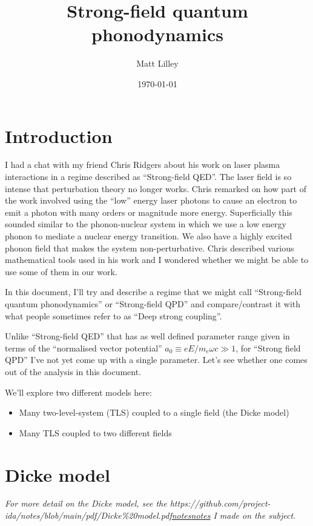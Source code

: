 \documentclass[
]{article}
\title{Strong-field quantum phonodynamics}
\author{Matt Lilley}
\date{\today}  %
\let\oldhref\href
\renewcommand{\href}[2]{\ifx#1\urlprefix\oldhref{#1}{#2}\else\uline{\oldhref{#1}{#2}}\fi}
\renewcommand{\[}{\begin{equation}}
\renewcommand{\]}{\end{equation}}
\providecommand{\tightlist}{%
  \setlength{\itemsep}{0pt}\setlength{\parskip}{0pt}}
\begin{document}
\maketitle

\section{Introduction}\label{introduction}

I had a chat with my friend Chris Ridgers about his work on laser plasma
interactions in a regime described as ``Strong-field QED''. The laser
field is so intense that perturbation theory no longer works. Chris
remarked on how part of the work involved using the ``low'' energy laser
photons to cause an electron to emit a photon with many orders or
magnitude more energy. Superficially this sounded similar to the
phonon-nuclear system in which we use a low energy phonon to mediate a
nuclear energy transition. We also have a highly excited phonon field
that makes the system non-perturbative. Chris described various
mathematical tools used in his work and I wondered whether we might be
able to use some of them in our work.

In this document, I'll try and describe a regime that we might call
``Strong-field quantum phonodynamics'' or ``Strong-field QPD'' and
compare/contrast it with what people sometimes refer to as ``Deep strong
coupling''.

Unlike ``Strong-field QED'' that has as well defined parameter range
given in terms of the ``normalised vector potential''
\(a_0\equiv eE/m_e\omega c\gg 1\), for ``Strong field QPD'' I've not yet
come up with a single parameter. Let's see whether one comes out of the
analysis in this document.

We'll explore two different models here:

\begin{itemize}
\tightlist
\item
  Many two-level-system (TLS) coupled to a single field (the Dicke
  model)
\item
  Many TLS coupled to two different fields
\end{itemize}

\section{Dicke model}\label{dicke-model}

\emph{For more detail on the Dicke model, see the
\href{https://github.com/project-ida/notes/blob/main/pdf/Dicke\%20model.pdf}{notes}
I made on the subject.}
\end{document}
